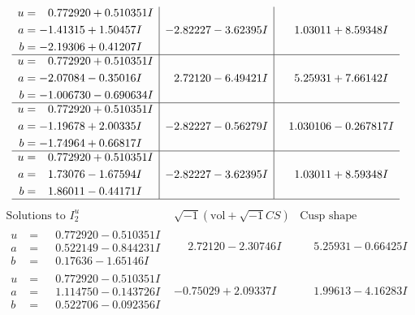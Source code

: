 \documentclass[1p]{elsarticle_modified}
\theoremstyle{definition}
\newcommand{\I}{\sqrt{-1}}
\begin{document}
$$\begin{array}{c|c|c}
\begin{aligned}
u &= \phantom{-}0.772920 + 0.510351 I \\
a &= -1.41315 + 1.50457 I \\
b &= -2.19306 + 0.41207 I\end{aligned}
 & -2.82227 - 3.62395 I & \phantom{-}1.03011 + 8.59348 I \\ \hline\begin{aligned}
u &= \phantom{-}0.772920 + 0.510351 I \\
a &= -2.07084 - 0.35016 I \\
b &= -1.006730 - 0.690634 I\end{aligned}
 & \phantom{-}2.72120 - 6.49421 I & \phantom{-}5.25931 + 7.66142 I \\ \hline\begin{aligned}
u &= \phantom{-}0.772920 + 0.510351 I \\
a &= -1.19678 + 2.00335 I \\
b &= -1.74964 + 0.66817 I\end{aligned}
 & -2.82227 - 0.56279 I & \phantom{-}1.030106 - 0.267817 I \\ \hline\begin{aligned}
u &= \phantom{-}0.772920 + 0.510351 I \\
a &= \phantom{-}1.73076 - 1.67594 I \\
b &= \phantom{-}1.86011 - 0.44171 I\end{aligned}
 & -2.82227 - 3.62395 I & \phantom{-}1.03011 + 8.59348 I\\
 \hline 
 \end{array}$$\newpage$$\begin{array}{c|c|c}  
\text{Solutions to }I^u_{2}& \I (\text{vol} + \sqrt{-1}CS) & \text{Cusp shape}\\
 \hline 
\begin{aligned}
u &= \phantom{-}0.772920 - 0.510351 I \\
a &= \phantom{-}0.522149 - 0.844231 I \\
b &= \phantom{-}0.17636 - 1.65146 I\end{aligned}
 & \phantom{-}2.72120 - 2.30746 I & \phantom{-}5.25931 - 0.66425 I \\ \hline\begin{aligned}
u &= \phantom{-}0.772920 - 0.510351 I \\
a &= \phantom{-}1.114750 - 0.143726 I \\
b &= \phantom{-}0.522706 - 0.092356 I\end{aligned}
 & -0.75029 + 2.09337 I & \phantom{-}1.99613 - 4.16283 I \\ \hline\begin{aligned}

\end{aligned}
\end{array}$$
\end{document}

